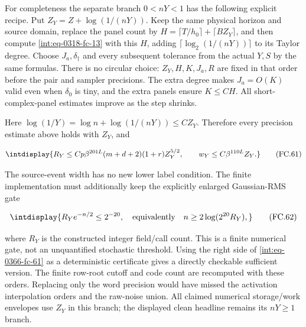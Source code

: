 
For completeness the separate branch \(0<nY<1\) has the following explicit recipe. Put \(Z_Y=Z+\log(1/(nY))\). Keep the same physical horizon and source domain, replace the panel count by \(H=\lceil T/h_0\rceil+\lceil BZ_Y\rceil\), and then compute \eqref{int:eq-0318-fc-13} with this \(H\), adding \(\lceil\log_2(1/(nY))\rceil\) to its Taylor degree. Choose \(J_a,\allowbreak \delta_\dagger\) and every subsequent tolerance from the actual \(Y,\allowbreak S\) by the same formulas. There is no circular choice: \(Z_Y,\allowbreak H,\allowbreak K,\allowbreak J_a,\allowbreak R\) are fixed in that order before the pair and sampler precisions. The extra degree makes \(J_a=O(K)\) valid even when \(\delta_0\) is tiny, and the extra panels ensure \(K\le CH\). All short-complex-panel estimates improve as the step shrinks.



Here \(\log(1/Y)=\log n+\log(1/(nY))\le CZ_Y\). Therefore every precision estimate above holds with \(Z_Y\), and


\begingroup\renewcommand{\theHequation}{intdisplay.767}
\begin{equation}
\intdisplay{
R_Y\le Cp\beta^{201L}(m+d+2)(1+r)Z_Y^{5/2},\qquad
w_Y\le C\beta^{110L}Z_Y.
}
\tag{FC.61}
\label{int:eq-0366-fc-61}
\end{equation}
\endgroup


The source-event width has no new lower label condition. The finite implementation must additionally keep the explicitly enlarged Gaussian-RMS gate


\begingroup\renewcommand{\theHequation}{intdisplay.768}
\begin{equation}
\intdisplay{
R_Ye^{-n/2}\le2^{-20},
\quad\text{equivalently}\quad n\ge2\log(2^{20}R_Y),
}
\tag{FC.62}
\label{int:eq-0367-fc-62}
\end{equation}
\endgroup


where \(R_Y\) is the constructed integer field/call count. This is a finite numerical gate, not an unquantified stochastic threshold. Using the right side of \eqref{int:eq-0366-fc-61} as a deterministic certificate gives a directly checkable sufficient version. The finite row-root cutoff and code count are recomputed with these orders. Replacing only the word precision would have missed the activation interpolation orders and the raw-noise union. All claimed numerical storage/work envelopes use \(Z_Y\) in this branch; the displayed clean headline remains its \(nY\ge1\) branch.


